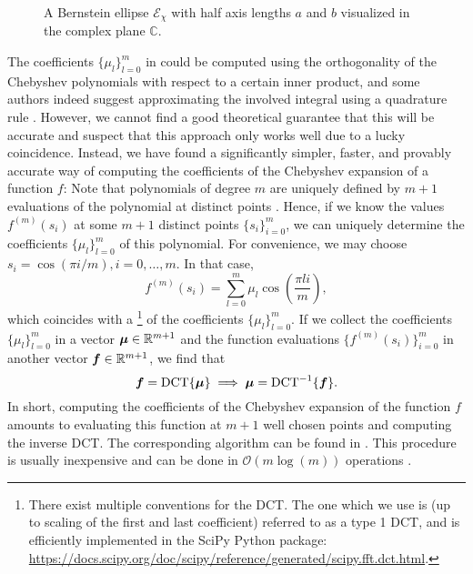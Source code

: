 \begin{figure}[ht]
    \centering
    
    \caption{A Bernstein ellipse $\mathcal{E}_{\chi}$ with half axis lengths $a$ and
        $b$ visualized in the complex plane $\mathbb{C}$.}
    \label{fig:2-chebyshev-proof-bernstein-ellipse}
\end{figure}

The coefficients $\{\mu_l\}_{l=0}^{m}$ in 
could be computed using the orthogonality of the Chebyshev polynomials with respect
to a certain inner product, and some authors indeed suggest approximating the
involved integral using a quadrature rule \cite[equation~8, algorithm~1]{lin2017randomized}.
However, we cannot find a good theoretical guarantee that this will be accurate
and suspect that this approach only works well due to a lucky coincidence.
Instead, we
have found a significantly simpler, faster, and provably accurate way of
computing the coefficients of the Chebyshev expansion of a function $f$:
Note that polynomials of degree $m$ are uniquely defined by $m+1$
evaluations of the polynomial at distinct points \cite{gauss1799demonstratio}.
Hence, if we know the values $f^{(m)}(s_i)$ at some $m+1$ distinct points 
$\{s_i\}_{i=0}^m$, we can uniquely determine the coefficients $\{\mu_l\}_{l=0}^{m}$
of this polynomial. For convenience, we may choose $s_i = \cos(\pi i/m), i=0,\dots,m$.
In that case,
\begin{equation}
    f^{(m)}(s_i) = \sum_{l=0}^{m} \mu_l \cos\left(\frac{\pi l i}{m}\right),
    \label{equ:2-chebyshev-chebyshev-nodes-evaluation}
\end{equation}
which coincides with a \footnote{There exist multiple conventions for the DCT.
The one which we use is (up to scaling of the first and last coefficient)
referred to as a type 1 DCT, and is efficiently implemented in the SciPy Python package:
\url{https://docs.scipy.org/doc/scipy/reference/generated/scipy.fft.dct.html}.} of the coefficients $\{\mu_l\}_{l=0}^{m}$.
If we collect the coefficients $\{\mu_l\}_{l=0}^{m}$ in a vector $\boldsymbol{\mu} \in \mathbb{R}^{m+1}$ 
and the function evaluations $\{f^{(m)}(s_i)\}_{i=0}^{m}$ in another
vector $\boldsymbol{f} \in \mathbb{R}^{m+1}$, we find that
\begin{equation}
    \boldsymbol{f} = \operatorname{DCT} \{ \boldsymbol{\mu} \} \implies \boldsymbol{\mu} = \operatorname{DCT}^{-1}\{ \boldsymbol{f} \}.
    \label{equ:2-chebyshev-chebyshev-DCT}
\end{equation}
In short, computing the coefficients of the Chebyshev expansion 
of the function $f$ amounts to evaluating this function at $m+1$ well
chosen points and computing the inverse \gls{DCT}. The corresponding algorithm
can be found in .
This procedure is usually inexpensive and can be done in $\mathcal{O}(m \log(m))$
operations \cite{makhoul1980fct}.

